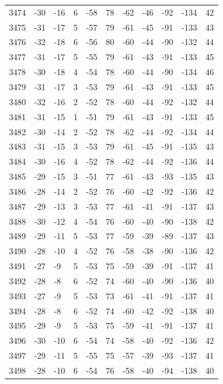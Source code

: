 \begin{table}[H]
\begin{tabular}{lllllllllll}
3474 & -30 & -16 & 6 & -58 & 78 & -62 & -46 & -92 & -134 & 42 \\
3475 & -31 & -17 & 5 & -57 & 79 & -61 & -45 & -91 & -133 & 43 \\
3476 & -32 & -18 & 6 & -56 & 80 & -60 & -44 & -90 & -132 & 44 \\
3477 & -31 & -17 & 5 & -55 & 79 & -61 & -43 & -91 & -133 & 45 \\
3478 & -30 & -18 & 4 & -54 & 78 & -60 & -44 & -90 & -134 & 46 \\
3479 & -31 & -17 & 3 & -53 & 79 & -61 & -43 & -91 & -133 & 45 \\
3480 & -32 & -16 & 2 & -52 & 78 & -60 & -44 & -92 & -132 & 44 \\
3481 & -31 & -15 & 1 & -51 & 79 & -61 & -43 & -91 & -133 & 45 \\
3482 & -30 & -14 & 2 & -52 & 78 & -62 & -44 & -92 & -134 & 44 \\
3483 & -31 & -15 & 3 & -53 & 79 & -61 & -45 & -91 & -135 & 43 \\
3484 & -30 & -16 & 4 & -52 & 78 & -62 & -44 & -92 & -136 & 44 \\
3485 & -29 & -15 & 3 & -51 & 77 & -61 & -43 & -93 & -135 & 43 \\
3486 & -28 & -14 & 2 & -52 & 76 & -60 & -42 & -92 & -136 & 42 \\
3487 & -29 & -13 & 3 & -53 & 77 & -61 & -41 & -91 & -137 & 43 \\
3488 & -30 & -12 & 4 & -54 & 76 & -60 & -40 & -90 & -138 & 42 \\
3489 & -29 & -11 & 5 & -53 & 77 & -59 & -39 & -89 & -137 & 43 \\
3490 & -28 & -10 & 4 & -52 & 76 & -58 & -38 & -90 & -136 & 42 \\
3491 & -27 & -9 & 5 & -53 & 75 & -59 & -39 & -91 & -137 & 41 \\
3492 & -28 & -8 & 6 & -52 & 74 & -60 & -40 & -90 & -136 & 40 \\
3493 & -27 & -9 & 5 & -53 & 73 & -61 & -41 & -91 & -137 & 41 \\
3494 & -28 & -8 & 6 & -52 & 74 & -60 & -42 & -92 & -138 & 40 \\
3495 & -29 & -9 & 5 & -53 & 75 & -59 & -41 & -91 & -137 & 41 \\
3496 & -30 & -10 & 6 & -54 & 74 & -58 & -40 & -92 & -136 & 42 \\
3497 & -29 & -11 & 5 & -55 & 75 & -57 & -39 & -93 & -137 & 41 \\
3498 & -28 & -10 & 6 & -54 & 76 & -58 & -40 & -94 & -138 & 40 \\

\end{tabular}
\end{table}
